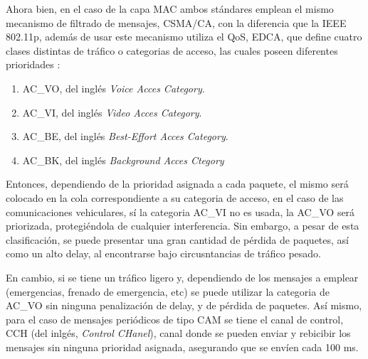 \par Ahora bien, en el caso de la capa MAC ambos stándares emplean el mismo mecanismo de filtrado de mensajes, CSMA/CA, con la diferencia que la IEEE 802.11p, además de usar este mecanismo utiliza el QoS, EDCA, que define cuatro clases distintas de tráfico o categorias de acceso, las cuales poseen diferentes prioridades \cite{milanes2012intelligent}:

 \begin{enumerate}
\item AC\_VO, del inglés \textit{Voice Acces Category}.
\item AC\_VI, del inglés \textit{Video Acces Category}.
\item AC\_BE, del inglés \textit{Best-Effort Acces Category}.
\item AC\_BK, del inglés \textit{Background Acces Ctegory} 
\end{enumerate}

\par Entonces, dependiendo de la prioridad asignada a cada paquete, el mismo será colocado en la cola correspondiente a su categoria de acceso, en el caso de las comunicaciones vehiculares, sí la categoria AC\_VI no es usada, la AC\_VO será priorizada, protegiéndola de cualquier interferencia. Sin embargo, a pesar de esta clasificación, se puede presentar una gran cantidad de pérdida de paquetes, así como un alto delay, al encontrarse bajo circusntancias de tráfico pesado.\\ 

\par En cambio, si se tiene un tráfico ligero y, dependiendo de los mensajes a emplear (emergencias, frenado de emergencia, etc) se puede utilizar la categoria de AC\_VO sin ninguna penalización de delay, y de pérdida de paquetes. Así mismo, para el caso de mensajes periódicos de tipo CAM se tiene el canal de control, CCH (del inlgés, \textit{Control CHanel}), canal donde se pueden enviar y rebicibir los mensajes sin ninguna prioridad asignada, asegurando que se envíen cada 100 ms.\\ 


